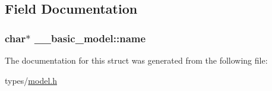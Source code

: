 \subsection{Field Documentation}
\subsubsection[{\texorpdfstring{name}{name}}]{\setlength{\rightskip}{0pt plus 5cm}char$\ast$ \+\_\+\+\_\+basic\+\_\+model\+::name}\hypertarget{struct____basic__model_a22834d9cad9b12aa77043dc19f52a197}{}\label{struct____basic__model_a22834d9cad9b12aa77043dc19f52a197}


The documentation for this struct was generated from the following file\+:\begin{DoxyCompactItemize}
\item 
types/\hyperlink{model_8h}{model.\+h}\end{DoxyCompactItemize}
